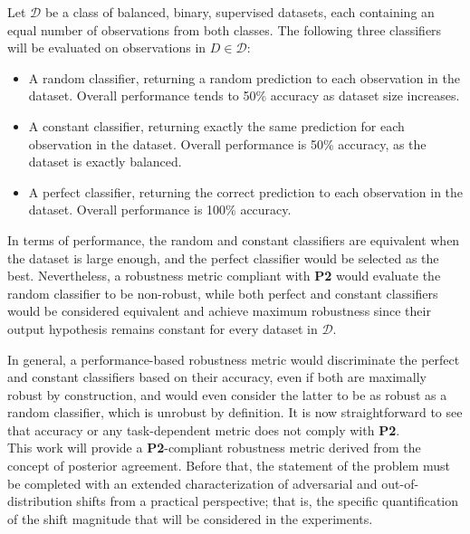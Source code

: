 \begin{example}\label{example:robustness}
    Let $\mathcal{D}$ be a class of balanced, binary, supervised datasets, each containing an equal 
    number of observations from both classes. The following three classifiers will be evaluated
    on observations in $D \in \mathcal{D}$:

    \begin{itemize}
        \item A random classifier, returning
        a random prediction to each observation in the dataset. Overall performance 
        tends to 50\% accuracy as dataset size increases. 
        \item A constant classifier, returning exactly the same
        prediction for each observation in the dataset. Overall performance is 50\% accuracy,
        as the dataset is exactly balanced.
        \item A perfect classifier, returning the correct prediction
        to each observation in the dataset. Overall performance is 100\% accuracy. 
    \end{itemize}

    In terms of performance, the random and constant classifiers are equivalent when
    the dataset is large enough, and the perfect classifier would be selected as the best.
    Nevertheless, a robustness metric compliant with \textbf{P2} would
    evaluate the random classifier to be non-robust, while both perfect and
    constant classifiers would be considered equivalent and achieve
    maximum robustness since their output hypothesis remains constant for 
    every dataset in $\mathcal{D}$.
\end{example}

In general, a performance-based robustness metric would discriminate the perfect and
constant classifiers based on their accuracy, even if both are maximally robust
by construction, and would even consider the latter to be as robust as 
a random classifier, which is unrobust by definition. It is now straightforward to see 
that accuracy or any task-dependent metric does not comply with \textbf{P2}. \\

This work will provide a \textbf{P2}-compliant robustness metric derived from the
concept of posterior agreement. Before that, the statement of the problem must be 
completed with an extended characterization of adversarial and out-of-distribution 
shifts from a practical perspective; that is, the specific quantification
of the shift magnitude that will be considered in the experiments.

